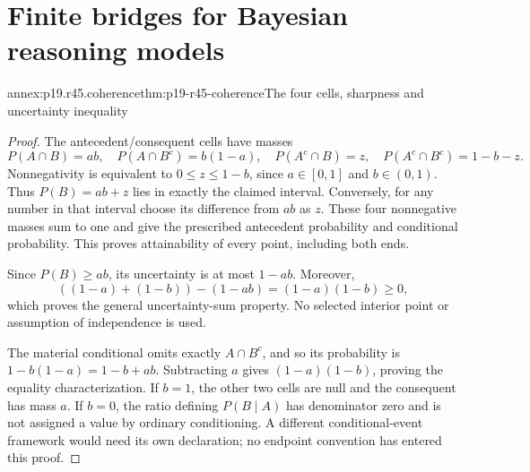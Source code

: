 \section{Finite bridges for Bayesian reasoning models}
\label{sec:annex-p19-rationality-4-5}

\begin{annexitem}{annex:p19.r45.coherence}{thm:p19-r45-coherence}{The four cells, sharpness and uncertainty inequality}
\begin{proof}
The antecedent/consequent cells have masses
\[
 P(A\cap B)=ab,\quad P(A\cap B^c)=b(1-a),\quad
 P(A^c\cap B)=z,\quad P(A^c\cap B^c)=1-b-z.
\]
Nonnegativity is equivalent to \(0\leq z\leq1-b\), since
\(a\in[0,1]\) and \(b\in(0,1)\). Thus
\(P(B)=ab+z\) lies in exactly the claimed interval. Conversely,
for any number in that interval choose its difference from \(ab\)
as \(z\). These four nonnegative masses sum to one and give the
prescribed antecedent probability and conditional probability. This
proves attainability of every point, including both ends.

Since \(P(B)\geq ab\), its uncertainty is at most \(1-ab\).
Moreover,
\[
 ((1-a)+(1-b))-(1-ab)=(1-a)(1-b)\geq0,
\]
which proves the general uncertainty-sum property. No selected interior
point or assumption of independence is used.

The material conditional omits exactly \(A\cap B^c\), and so
its probability is \(1-b(1-a)=1-b+ab\). Subtracting \(a\)
gives \((1-a)(1-b)\), proving the equality characterization.
If \(b=1\), the other two cells are null and the consequent has
mass \(a\). If \(b=0\), the ratio defining \(P(B\mid A)\)
has denominator zero and is not assigned a value by ordinary
conditioning. A different conditional-event framework would need its
own declaration; no endpoint convention has entered this proof.
\end{proof}
\end{annexitem}

